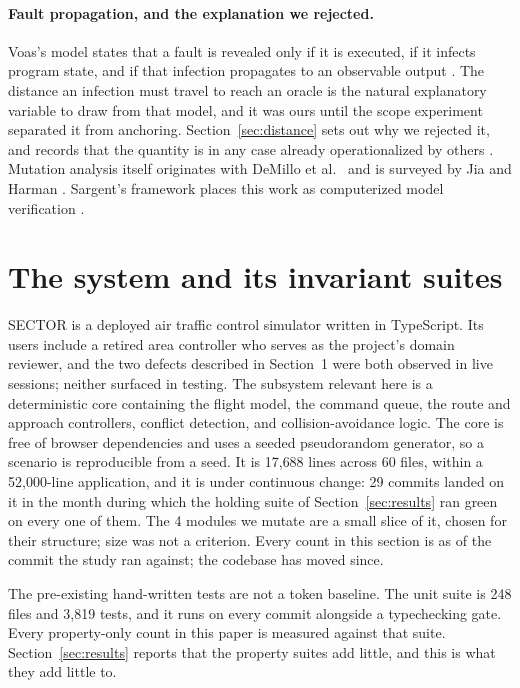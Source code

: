 \documentclass[12pt]{article}
\begin{document}
\paragraph{Fault propagation, and the explanation we rejected.} Voas's model
states that a fault is revealed only if it is executed, if it infects program
state, and if that infection propagates to an observable output \cite{voas1992}.
The distance an infection must travel to reach an oracle is the natural
explanatory variable to draw from that model, and it was ours until the scope
experiment separated it from anchoring. Section~\ref{sec:distance} sets out why we
rejected it, and records that the quantity is in any case already operationalized
by others \cite{niedermayr2019,veraperez2019,jahangirova2016}. Mutation analysis itself
originates with DeMillo et al.\ \cite{demillo1978} and is surveyed by Jia
and Harman \cite{jia2011}. Sargent's framework places this work as computerized
model verification \cite{sargent2013}.

\section{The system and its invariant suites}
\label{sec:system}

SECTOR is a deployed air traffic control simulator written in TypeScript. Its
users include a retired area controller who serves as the project's domain
reviewer, and the two defects described in Section~1 were both observed in live sessions; neither surfaced in testing. The subsystem relevant here is a deterministic
core containing the flight model, the command queue, the route and approach
controllers, conflict detection, and collision-avoidance logic. The core is free
of browser dependencies and uses a seeded pseudorandom generator, so a scenario
is reproducible from a seed. It is 17{,}688 lines across 60 files, within a
52{,}000-line application, and it is under continuous change: 29 commits landed on
it in the month during which the holding suite of Section~\ref{sec:results} ran
green on every one of them. The 4 modules we mutate are a small slice of it,
chosen for their structure; size was not a criterion. Every count in this
section is as of the commit the study ran against; the codebase has moved since.

The pre-existing hand-written tests are not a token baseline. The unit suite is
248 files and 3{,}819 tests, and it runs on every commit alongside a typechecking
gate. Every property-only count in this paper is measured against that
suite. Section~\ref{sec:results} reports that the property suites add little, and
this is what they add little to.
\end{document}

